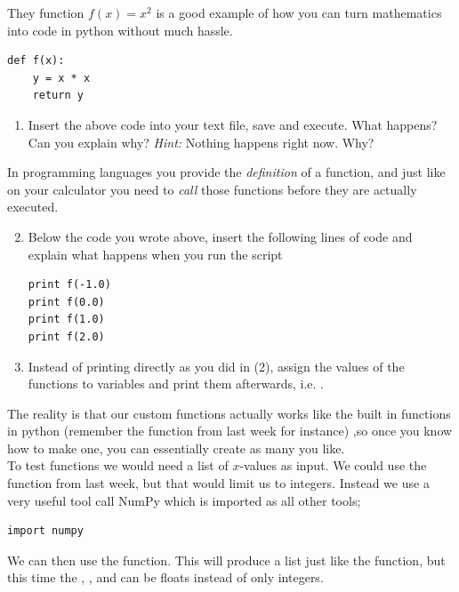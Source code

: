 \documentclass{article}
\begin{document}
They function $f(x)=x^2$ is a good example of how you can turn mathematics into code in python without much hassle.

\begin{lstlisting}
def f(x):
    y = x * x
    return y
\end{lstlisting}


\begin{enumerate}
  \item Insert the above code into your text file, save and execute. What
      happens? Can you explain why? {\em Hint:} Nothing happens right now. Why?
\end{enumerate}

In programming languages you provide the {\em definition} of a function, and
just like on your calculator you need to {\em call} those functions before they
are actually executed.

\begin{enumerate}
  \setcounter{enumi}{1}
  \item Below the code you wrote above, insert the following lines of code and
    explain what happens when you run the script

\begin{lstlisting}
print f(-1.0)
print f(0.0)
print f(1.0)
print f(2.0)
\end{lstlisting}

  \item Instead of printing directly as you did in (2), assign the values of
    the functions to variables and print them afterwards, i.e. .

\end{enumerate}

The reality is that our custom functions actually works like the built in
functions in python (remember the  function from last week for instance)
,so once you know how to make one, you can essentially create as many you like.\\

To test functions we would need a list of $x$-values as input.
We could use the  function from last week, but that would limit us to
integers. Instead we use a very useful tool call NumPy which is imported as all other tools;

\begin{lstlisting}
import numpy
\end{lstlisting}

We can then use the  function.
This will produce a list just like the  function, but this time the
,
, and
can be floats instead of only integers.
\end{document}
